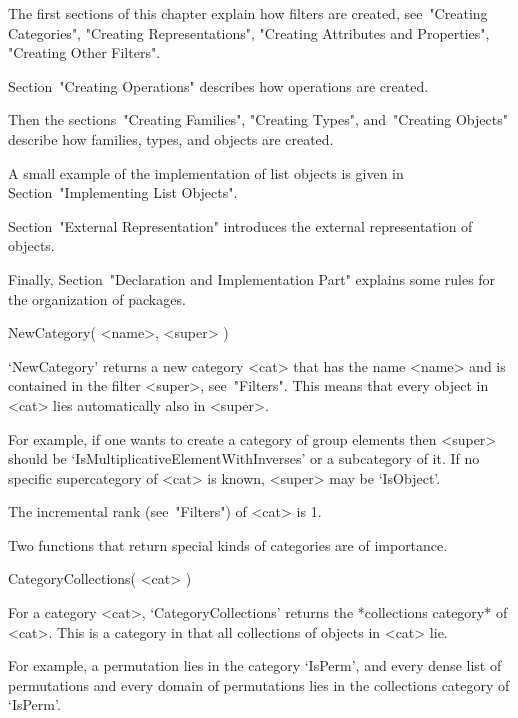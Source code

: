 

The first sections of this chapter explain how filters are created,
see~"Creating Categories", "Creating Representations",
"Creating Attributes and Properties", "Creating Other Filters".

Section~"Creating Operations" describes how operations are created.

Then the sections~"Creating Families", "Creating Types",
and~"Creating Objects" describe how families, types,
and objects are created.

A small example of the implementation of list objects is given
in Section~"Implementing List Objects".

Section~"External Representation" introduces the external representation
of objects.

Finally, Section~"Declaration and Implementation Part" explains some
rules for the organization of {\GAP} packages.



\>NewCategory( <name>, <super> )

`NewCategory' returns a new category <cat> that has the name <name> and
is contained in the filter <super>, see~"Filters".
This means that every object in <cat> lies automatically also in <super>.

For example, if one wants to create a category of group elements
then <super> should be `IsMultiplicativeElementWithInverses' or a
subcategory of it.
If no specific supercategory of <cat> is known,
<super> may be `IsObject'.

The incremental rank (see~"Filters") of <cat> is 1.

Two functions that return special kinds of categories are of importance.

\>CategoryCollections( <cat> )

For a category <cat>,
`CategoryCollections' returns the *collections category* of <cat>.
This is a category in that all collections of objects in <cat> lie.

For example, a permutation lies in the category `IsPerm',
and every dense list of permutations and every domain of permutations
lies in the collections category of `IsPerm'.


